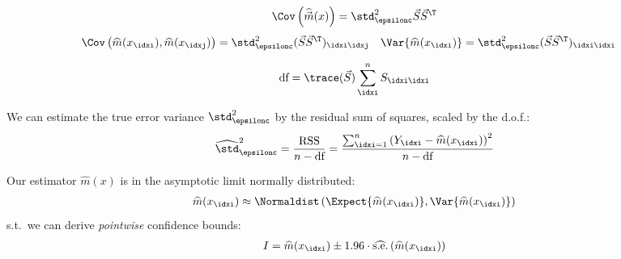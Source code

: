 \begin{defnbox}\nospacing
    \begin{defn}\label{defn:covariance_of_the_estimator}
        \begin{align}
          \Cov\left(\widehat{\vec{m}}(x)\right)=\std_{\epsilonc}^{2}\vec{S}\vec{S}^{\T}
        \end{align}
        \begin{align*}
          &\Cov\left(\widehat{m}(x_{\idxi}),\widehat{m}(x_{\idxj})\right)
                         =\std_{\epsilonc}^{2}(\vec{S}\vec{S}^{\T})_{\idxi\idxj}
                         &&\Var{\widehat{m}(x_{\idxi})}=\std_{\epsilonc}^{2}(\vec{S}\vec{S}^{\T})_{\idxi\idxi}
        \end{align*}
    \end{defn}
\end{defnbox}
\begin{defnbox}\nospacing
    \begin{defn}\label{defn:degrees_of_freedom}
        \begin{align}
          \text{df}=\trace(\vec{S})\sum_{\idxi}^{n}S_{\idxi\idxi}
        \end{align}
    \end{defn}
\end{defnbox}
\begin{propositionbox}\nospacing
    \begin{proposition}\label{proposition:estimation_of_the_error_variance}
        We can estimate the true error variance $\std_{\epsilonc}^{2}$ by the residual sum of squares, scaled by the d.o.f.:
        \begin{align}
          \widehat{\std}_{\epsilonc}^{2}=\frac{\text{RSS}}{n-\text{df}}=
          \frac{\sum_{\idxi=1}^{n}\left(Y_{\idxi}-\widehat{m}(x_{\idxi})\right)^{2}}{n-\text{df}}
        \end{align}
    \end{proposition}
\end{propositionbox}
\begin{sectionbox}\nospacing
    Our estimator $\widehat{m}(x)$ is in the asymptotic limit normally distributed:
    \begin{align}
      \widehat{m}(x_{\idxi})\approx\Normaldist \left(\Expect{\widehat{m}(x_{\idxi})},\Var{\widehat{m}(x_{\idxi})}\right)
    \end{align}
    s.t.\ we can derive \textit{pointwise} confidence bounds:
    \begin{align}
      I=\widehat{m}(x_{\idxi})\pm1.96\cdot\widehat{\text{s.e.}}\left(\widehat{m}(x_{\idxi})\right)
    \end{align}
\end{sectionbox}
